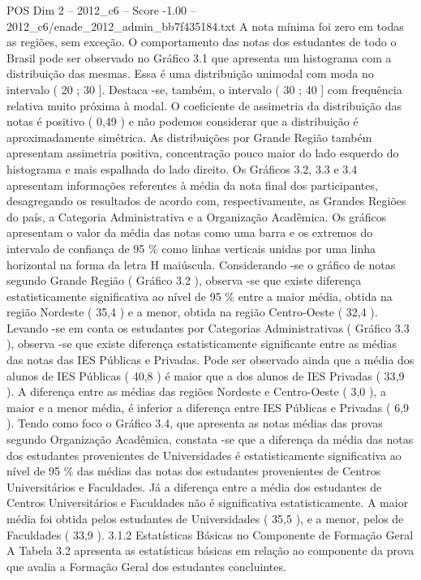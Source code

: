 \begin{textsample}{POS Dim 2 – 2012\_c6 – Score -1.00 – 2012\_c6/enade\_2012\_admin\_bb7f435184.txt}
A nota mínima foi zero em todas as regiões, sem exceção.
O comportamento das notas dos estudantes de todo o Brasil pode ser observado no Gráfico 3.1 que apresenta um histograma com a distribuição das mesmas.
Essa é uma distribuição unimodal com moda no intervalo ( 20 ; 30 ].
Destaca -se, também, o intervalo ( 30 ; 40 ] com frequência relativa muito próxima à modal.
O coeficiente de assimetria da distribuição das notas é positivo ( 0,49 ) e não podemos considerar que a distribuição é aproximadamente simétrica.
As distribuições por Grande Região também apresentam assimetria positiva, concentração pouco maior do lado esquerdo do histograma e mais espalhada do lado direito.
Os Gráficos 3.2, 3.3 e 3.4 apresentam informações referentes à média da nota final dos participantes, desagregando os resultados de acordo com, respectivamente, as Grandes Regiões do país, a Categoria Administrativa e a Organização Acadêmica.
Os gráficos apresentam o valor da média das notas como uma barra e os extremos do intervalo de confiança de 95 \% como linhas verticais unidas por uma linha horizontal na forma da letra H maiúscula.
Considerando -se o gráfico de notas segundo Grande Região ( Gráfico 3.2 ), observa -se que existe diferença estatisticamente significativa ao nível de 95 \% entre a maior média, obtida na região Nordeste ( 35,4 ) e a menor, obtida na região Centro-Oeste ( 32,4 ).
Levando -se em conta os estudantes por Categorias Administrativas ( Gráfico 3.3 ), observa -se que existe diferença estatisticamente significante entre as médias das notas das IES Públicas e Privadas.
Pode ser observado ainda que a média dos alunos de IES Públicas ( 40,8 ) é maior que a dos alunos de IES Privadas ( 33,9 ).
A diferença entre as médias das regiões Nordeste e Centro-Oeste ( 3,0 ), a maior e a menor média, é inferior a diferença entre IES Públicas e Privadas ( 6,9 ).
Tendo como foco o Gráfico 3.4, que apresenta as notas médias das provas segundo Organização Acadêmica, constata -se que a diferença da média das notas dos estudantes provenientes de Universidades é estatisticamente significativa ao nível de 95 \% das médias das notas dos estudantes provenientes de Centros Universitários e Faculdades.
Já a diferença entre a média dos estudantes de Centros Universitários e Faculdades não é significativa estatisticamente.
A maior média foi obtida pelos estudantes de Universidades ( 35,5 ), e a menor, pelos de Faculdades ( 33,9 ). 3.1.2 Estatísticas Básicas no Componente de Formação Geral A Tabela 3.2 apresenta as estatísticas básicas em relação ao componente da prova que avalia a Formação Geral dos estudantes concluintes.

\end{textsample}
